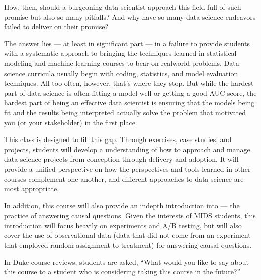\documentclass[letterpaper,10pt,english]{jupyterBook}
\begin{document}
\sphinxAtStartPar
How, then, should a burgeoning data scientist approach this field full of such promise but also so many pitfalls? And why have so many data science endeavors failed to deliver on their promise?

\sphinxAtStartPar
The answer lies — at least in significant part — in a failure to provide students with a systematic approach to bringing the techniques learned in statistical modeling and machine learning courses to bear on real\sphinxhyphen{}world problems. Data science curricula usually begin with coding, statistics, and model evaluation techniques. All too often, however, that’s where they stop. But while the hardest part of data science  is often fitting a model well or getting a good AUC score, the hardest part of being an effective  data scientist is ensuring that the models being fit and the results being interpreted actually solve the problem that motivated you (or your stakeholder) in the first place.

\sphinxAtStartPar
This class is designed to fill this gap. Through exercises, case studies, and projects, students will develop a  understanding of how to approach and manage data science projects from conception through delivery and adoption. It will provide a unified perspective on how the perspectives and tools learned in other courses complement one another, and  different approaches to data science are most appropriate.

\sphinxAtStartPar
In addition, this course will also provide an in\sphinxhyphen{}depth introduction into  — the practice of answering causal questions. Given the interests of MIDS students, this introduction will focus heavily on experiments and A/B testing, but will also cover the use of observational data (data that did not come from an experiment that employed random assignment to treatment) for answering causal questions.

\begin{DUlineblock}{0em}
\item[] 
\end{DUlineblock}

\sphinxAtStartPar
In Duke course reviews, students are asked, “What would you like to say about this course to a student who is considering taking this course in the future?”
\end{document}
